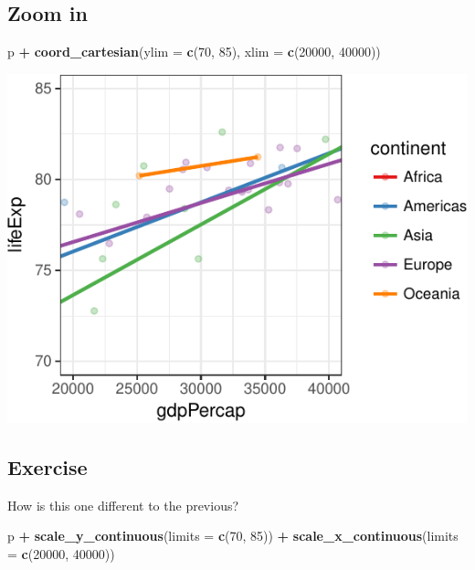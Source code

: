 \documentclass[12pt,]{krantz}
\makeatletter
\newenvironment{Shaded}{\begin{snugshade}}{\end{snugshade}}
\newcommand{\DataTypeTok}[1]{\textcolor[rgb]{0.13,0.29,0.53}{#1}}
\newcommand{\DecValTok}[1]{\textcolor[rgb]{0.00,0.00,0.81}{#1}}
\newcommand{\KeywordTok}[1]{\textcolor[rgb]{0.13,0.29,0.53}{\textbf{#1}}}
\newcommand{\NormalTok}[1]{#1}
\newcommand{\OperatorTok}[1]{\textcolor[rgb]{0.81,0.36,0.00}{\textbf{#1}}}
\newcommand{\StringTok}[1]{\textcolor[rgb]{0.31,0.60,0.02}{#1}}
\newenvironment{kframe}{%
\medskip{}
\setlength{\fboxsep}{.8em}
 \def\at@end@of@kframe{}%
 \ifinner\ifhmode%
  \def\at@end@of@kframe{\end{minipage}}%
  \begin{minipage}{\columnwidth}%
 \fi\fi%
 \def\FrameCommand##1{\hskip\@totalleftmargin \hskip-\fboxsep
 \colorbox{shadecolor}{##1}\hskip-\fboxsep
     \hskip-\linewidth \hskip-\@totalleftmargin \hskip\columnwidth}%
 \MakeFramed {\advance\hsize-\width
   \@totalleftmargin\z@ \linewidth\hsize
   \@setminipage}}%
 {\par\unskip\endMakeFramed%
 \at@end@of@kframe}
\renewenvironment{Shaded}{\begin{kframe}}{\end{kframe}}
\theoremstyle{definition}
\theoremstyle{definition}
\theoremstyle{definition}
\theoremstyle{remark}
\makeatother
\begin{document}
\hypertarget{zoom-in}{%
\subsection{Zoom in}\label{zoom-in}}

\begin{Shaded}
\begin{Highlighting}[]
\NormalTok{p }\OperatorTok{+}
\StringTok{  }\KeywordTok{coord_cartesian}\NormalTok{(}\DataTypeTok{ylim =} \KeywordTok{c}\NormalTok{(}\DecValTok{70}\NormalTok{, }\DecValTok{85}\NormalTok{), }\DataTypeTok{xlim =} \KeywordTok{c}\NormalTok{(}\DecValTok{20000}\NormalTok{, }\DecValTok{40000}\NormalTok{))}
\end{Highlighting}
\end{Shaded}

\includegraphics{05_fine_tuning_plots_files/figure-latex/unnamed-chunk-6-1.pdf}

\hypertarget{exercise-24}{%
\subsection{Exercise}\label{exercise-24}}

How is this one different to the previous?

\begin{Shaded}
\begin{Highlighting}[]
\NormalTok{p }\OperatorTok{+}
\StringTok{  }\KeywordTok{scale_y_continuous}\NormalTok{(}\DataTypeTok{limits =} \KeywordTok{c}\NormalTok{(}\DecValTok{70}\NormalTok{, }\DecValTok{85}\NormalTok{)) }\OperatorTok{+}
\StringTok{  }\KeywordTok{scale_x_continuous}\NormalTok{(}\DataTypeTok{limits =} \KeywordTok{c}\NormalTok{(}\DecValTok{20000}\NormalTok{, }\DecValTok{40000}\NormalTok{))}
\end{Highlighting}
\end{Shaded}
\end{document}
